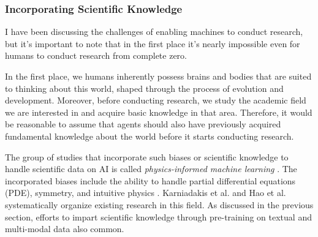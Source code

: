 












\subsubsection{Incorporating Scientific Knowledge}

I have been discussing the challenges of enabling machines to conduct research, but it's important to note that in the first place it's nearly impossible even for humans to conduct research from complete zero. 

In the first place, we humans inherently possess brains and bodies that are suited to thinking about this world, shaped through the process of evolution and development. Moreover, before conducting research, we study the academic field we are interested in and acquire basic knowledge in that area. Therefore, it would be reasonable to assume that agents should also have previously acquired fundamental knowledge about the world before it starts conducting research.

The group of studies that incorporate such biases or scientific knowledge to handle scientific data on AI is called \textit{physics-informed machine learning} \cite{karniadakis2021physics}. The incorporated biases include the ability to handle partial differential equations (PDE), symmetry, and intuitive physics \cite{hao2022physics}. Karniadakis et al. \cite{karniadakis2021physics} and Hao et al. \cite{hao2022physics} systematically organize existing research in this field. As discussed in the previous section, efforts to impart scientific knowledge through pre-training on textual and multi-modal data also common.

